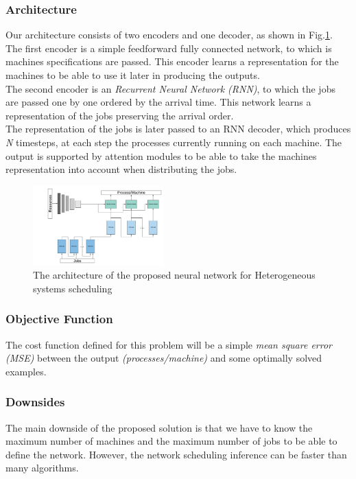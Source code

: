 \documentclass[twocolumn,11pt]{IEEEtran}
\begin{document}
    \subsubsection{Architecture}
    Our architecture consists of two encoders and one decoder, as shown in Fig.\ref{fig:nn}. \\
    The first encoder is a simple feedforward fully connected network, to which is machines specifications are passed. This encoder learns a representation for the machines to be able to use it later in producing the outputs. \\
    The second encoder is an \emph{Recurrent Neural Network (RNN)}, to which the jobs are passed one by one ordered by the arrival time. This network learns a representation of the jobs preserving the arrival order. \\
    The representation of the jobs is later passed to an RNN decoder, which produces \emph{N} timesteps, at each step the processes currently running on each machine. The output is supported by attention modules to be able to take the machines representation into account when distributing the jobs.
    
    \begin{figure}[hp]
        \centering
        \includegraphics[width=0.45\textwidth]{sched_nn}
        \caption{The architecture of the proposed neural network for Heterogeneous systems scheduling}
        \label{fig:nn}
    \end{figure}
    
    \subsubsection{Objective Function}
    The cost function defined for this problem will be a simple \emph{mean square error (MSE)} between the output \emph{(processes/machine)} and some optimally solved examples.
    
    \subsubsection{Downsides}
    The main downside of the proposed solution is that we have to know the maximum number of machines and the maximum number of jobs to be able to define the network. However, the network scheduling inference can be faster than many algorithms. 
    
\end{document}
